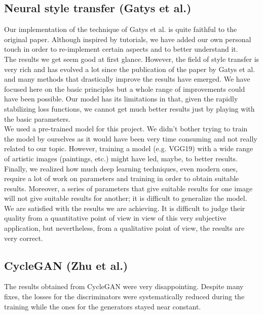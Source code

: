\documentclass[twocolumn,superscriptaddress,aps, floatfix]{revtex4-1}
\begin{document}
    \subsection{Neural style transfer (Gatys et al.)}
    
    Our implementation of the technique of Gatys et al. is quite faithful to the original paper. Although inspired by tutorials, we have added our own personal touch in order to re-implement certain aspects and to better understand it.\\
    
    The results we get seem good at first glance. However, the field of style transfer is very rich and has evolved a lot since the publication of the paper by Gatys et al. \cite{DBLP:journals/corr/GatysEB15a} and many methods that drastically improve the results have emerged. We have focused here on the basic principles but a whole range of improvements could have been possible. Our model has its limitations in that, given the rapidly stabilizing loss functions, we cannot get much better results just by playing with the basic parameters.\\
    
    We used a pre-trained model for this project. We didn't bother trying to train the model by ourselves as it would have been very time consuming and not really related to our topic. However, training a model (e.g. VGG19) with a wide range of artistic images (paintings, etc.) might have led, maybe, to better results.\\
    
    Finally, we realized how much deep learning techniques, even modern ones, require a lot of work on parameters and training in order to obtain suitable results. Moreover, a series of parameters that give suitable results for one image will not give suitable results for another; it is difficult to generalize the model.\\
    
    We are satisfied with the results we are achieving. It is difficult to judge their quality from a quantitative point of view in view of this very subjective application, but nevertheless, from a qualitative point of view, the results are very correct.
    
    \subsection{CycleGAN (Zhu et al.)}
    
    The results obtained from CycleGAN were very disappointing. Despite many fixes, the losses for the discriminators were systematically reduced during the training while the ones for the generators stayed near constant.
    
    
    
    \newpage
    
    
    
    \nocite{*}
\end{document}
